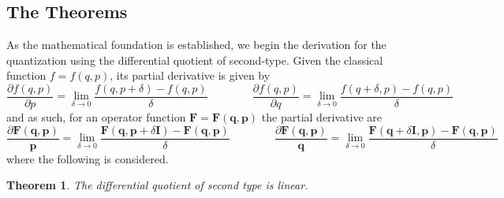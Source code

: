 \documentclass[a4paper]{article}
\newtheorem{theorem}{Theorem}[section]
\theoremstyle{definition}
\begin{document}
\subsection{The Theorems}
As the mathematical foundation is established, we begin the derivation for the quantization using the differential quotient of second-type. Given the classical function $f=f(q,p)$, its partial derivative is given by
\begin{equation}
	\frac{\partial f(q,p)}{\partial p}=\lim_{\delta\to0}\frac{f(q,p+\delta)-f(q,p)}{\delta}\qquad\qquad\frac{\partial f(q,p)}{\partial q}=\lim_{\delta\to0}\frac{f(q+\delta,p)-f(q,p)}{\delta}
\end{equation}
and as such, for an operator function $\textbf{F}=\textbf{F}(\textbf{q},\textbf{p})$ the partial derivative are
\begin{equation}
	\frac{\partial\textbf{F}(\textbf{q},\textbf{p})}{\textbf{p}}=\lim_{\delta\to0}\frac{\textbf{F}(\textbf{q},\textbf{p}+\delta\textbf{I})-\textbf{F}(\textbf{q},\textbf{p})}{\delta}\qquad\qquad\frac{\partial\textbf{F}(\textbf{q},\textbf{p})}{\textbf{q}}=\lim_{\delta\to0}\frac{\textbf{F}(\textbf{q}+\delta\textbf{I},\textbf{p})-\textbf{F}(\textbf{q},\textbf{p})}{\delta}
\end{equation}
where the following is considered.
\begin{theorem}
	The differential quotient of second type is linear.
\end{theorem}
\end{document}
